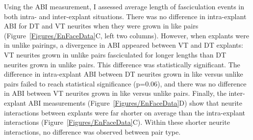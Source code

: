 Using the ABI measurement, I assessed average length of fasciculation events in both intra- and inter-explant situations.
There was no difference in intra-explant ABI for DT and VT neurites when they were grown in like pairs (Figure~\ref{Figures/EnFaceData}C, left two columns).
However, when explants were in unlike pairings, a divergence in ABI appeared between VT and DT explants: VT neurites grown in unlike pairs fasciculated for longer lengths than DT neurites grown in unlike pairs.
This difference was statistically significant.
The difference in intra-explant ABI between DT neurites grown in like versus unlike pairs failed to reach statistical significance (p=0.06), and there was no difference in ABI between VT neurites grown in like versus unlike pairs.
Finally, the inter-explant ABI measurements (Figure~\ref{Figures/EnFaceData}D) show that neurite interactions between explants were far shorter on average than the intra-explant interactions (Figure~\ref{Figures/EnFaceData}C).
Within these shorter neurite interactions, no difference was observed between pair type.

